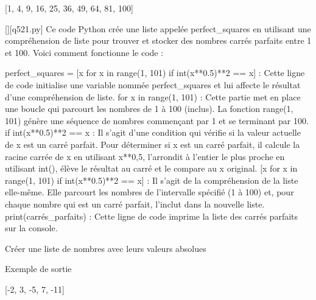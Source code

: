 [1, 4, 9, 16, 25, 36, 49, 64, 81, 100]
        \par
        \begin{solution}
            \renewcommand{\nomfichier}{q521.py}
            \pythonfile{\chemincode \nomfichier}[][\nomfichier]
            Ce code Python crée une liste appelée perfect\_squares en utilisant une compréhension de liste pour trouver et stocker des nombres carrés parfaits entre 1 et 100. Voici comment fonctionne le code :

    perfect\_squares = [x for x in range(1, 101) if int(x**0.5)**2 == x] : Cette ligne de code initialise une variable nommée perfect\_squares et lui affecte le résultat d'une compréhension de liste.
        for x in range(1, 101) : Cette partie met en place une boucle qui parcourt les nombres de 1 à 100 (inclus). La fonction range(1, 101) génère une séquence de nombres commençant par 1 et se terminant par 100.
        if int(x**0.5)**2 == x : Il s'agit d'une condition qui vérifie si la valeur actuelle de x est un carré parfait. Pour déterminer si x est un carré parfait, il calcule la racine carrée de x en utilisant x**0,5, l'arrondit à l'entier le plus proche en utilisant int(), élève le résultat au carré et le compare au x original.
        [x for x in range(1, 101) if int(x**0.5)**2 == x] : Il s'agit de la compréhension de la liste elle-même. Elle parcourt les nombres de l'intervalle spécifié (1 à 100) et, pour chaque nombre qui est un carré parfait, l'inclut dans la nouvelle liste.
    print(carrés\_parfaits) : Cette ligne de code imprime la liste des carrés parfaits sur la console.
        \end{solution}
        

        \question
        Créer une liste de nombres avec leurs valeurs absolues

Exemple de sortie

[-2, 3, -5, 7, -11]

